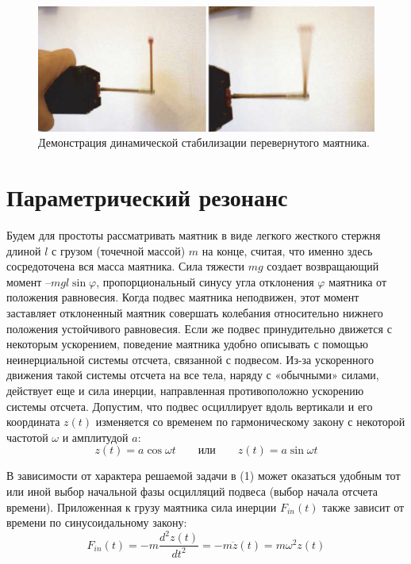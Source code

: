 \documentclass[a4paper,12pt]{article} %
\begin{document}
\begin{figure}[h]
\centering
\includegraphics[scale=0.4]{1}
\caption{Демонстрация динамической стабилизации перевернутого маятника.}
\end{figure}
\section{Параметрический резонанс}
Будем для простоты рассматривать маятник в виде легкого жесткого стержня длиной $l$ с грузом (точечной массой) $m$ на конце, считая, что именно здесь сосредоточена вся масса маятника. Сила тяжести $mg$ создает возвращающий момент --$mgl\sin\varphi$, пропорциональный синусу угла отклонения $\varphi$ маятника от положения равновесия. Когда подвес маятника неподвижен, этот момент заставляет отклоненный маятник совершать колебания относительно нижнего положения устойчивого равновесия. Если же подвес принудительно движется с некоторым ускорением, поведение маятника удобно описывать с помощью неинерциальной системы отсчета, связанной с подвесом. Из-за ускоренного движения такой системы отсчета на все тела, наряду с «обычными» силами, действует еще и сила инерции, направленная противоположно ускорению системы отсчета. Допустим, что подвес осциллирует вдоль вертикали и его координата $z(t)$ изменяется со временем по гармоническому закону с некоторой частотой $\omega$ и амплитудой $a$:
\begin{equation}
z(t) = a\cos\omega t \qquad
\text{или} \qquad
z(t) = a\sin\omega t 
\end{equation}

В зависимости от характера решаемой задачи в (1) может оказаться удобным тот или иной выбор начальной фазы осцилляций подвеса (выбор начала отсчета времени). Приложенная к грузу маятника сила инерции $F_{in}(t)$ также зависит от времени по синусоидальному закону:
\begin{equation}
F_{in}(t) = -m\frac{d^2z(t)}{dt^2} = -m\ddot{z}(t) = m\omega^2 z(t)
\end{equation}
\end{document}
